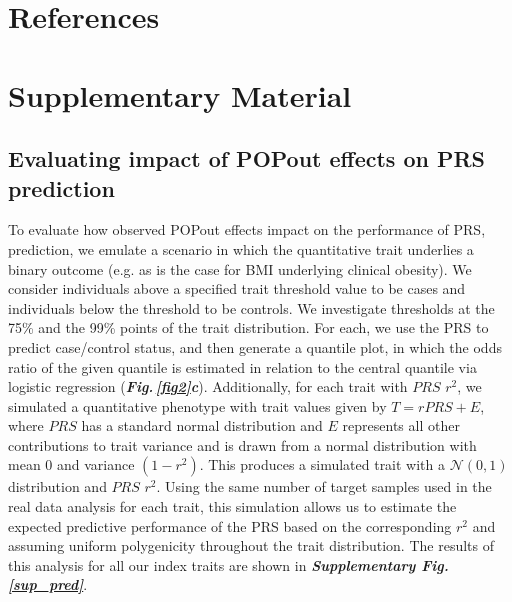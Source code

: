 \documentclass[12pt]{zHenriquesLab-StyleBioRxiv}
\newcommand\dref[2]{\normalsize{\textbf{\textit{Fig.\,\ref{#1}#2}}}\normalsize{}}
\newcommand\sref[1]{\normalsize{\textbf{\textit{Supplementary Fig.\,\ref{#1}}}}\normalsize{}}
\begin{document}
{\section*{References} \label{sec:references} 

\clearpage \newpage





\renewcommand{\figurename}{Supplementary Figure}
\setcounter{figure}{0}   

\section*{Supplementary Material} \label{sec:supplement}

\subsection*{Evaluating impact of POPout effects on PRS prediction} 
To evaluate how observed POPout effects impact on the performance of
PRS, prediction, we emulate a scenario in which the quantitative trait
underlies a binary outcome (e.g. as is the case for BMI underlying
clinical obesity). We consider individuals above a specified trait
threshold value to be cases and individuals below the threshold to be
controls. We investigate thresholds at the 75\% and the 99\% points of
the trait distribution. For each, we use the PRS to predict
case/control status, and then generate a quantile plot, in which the
odds ratio of the given quantile is estimated in relation to the
central quantile via logistic regression
(\dref{fig2}{c}). Additionally, for each trait with $PRS$ $r^2$, we
simulated a quantitative phenotype with trait values given by
$T=r{PRS}+E$, where $PRS$ has a standard normal distribution and $E$
represents all other contributions to trait variance and is drawn from
a normal distribution with mean 0 and variance $(1-r^2)$. This
produces a simulated trait with a $\mathcal{N}(0,1)$ distribution and
$PRS$ $r^2$. Using the same number of target samples used in the real
data analysis for each trait, this simulation allows us to estimate
the expected predictive performance of the PRS based on the
corresponding $r^2$ and assuming uniform polygenicity throughout the
trait distribution.  The results of this analysis for all our index
traits are shown in \sref{sup_pred}.

}
\end{document}
